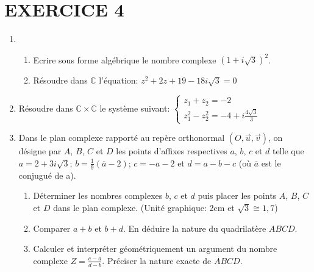\documentclass[13pts]{report}
\begin{document}
	\section*{EXERCICE 4}
		\begin{enumerate}
			\item 
				\begin{enumerate}
					\item Ecrire sous forme algébrique le nombre complexe $(1+i\sqrt{3})^2$.
					\item Résoudre dans $\mathbb{C}$ l'équation: $z^2+2z+19-18i\sqrt{3}=0$
				\end{enumerate}
			\item Résoudre dans $\mathbb{C} \times \mathbb{C}$ le système suivant:
				$\left\{ \begin{array}{l}
					z_1 + z_2 =-2 \\
					z_1^2-z_2^2=-4+i\frac{4\sqrt{3}}{3}
				\end{array} \right.$
				\item Dans le plan complexe rapporté au repère orthonormal $(O,\overrightarrow{u}, \overrightarrow{v})$, on désigne par $A$, $B$, $C$ et $D$ les points d'affixes respectives $a$, $b$, $c$ et $d$ telle que $a=2+3i\sqrt{3}$; $b=\frac{1}{9}(\overline{a} - 2)$; $c=-a-2$  et $d= a-b-c$ (où $\overline{a}$ est le conjugué de a).
			\begin{enumerate}
				\item Déterminer les nombres complexes $b$, $c$ et $d$ puis placer les points $A$, $B$, $C$ et $D$ dans le plan complexe. (Unité graphique: 2cm et $\sqrt{3}\cong 1,7$)
				\item Comparer $a+b$ et $b+d$. En déduire la nature du quadrilatère $ABCD$.
				\item Calculer et interpréter géométriquement un argument du nombre complexe $Z=\frac{c-a}{d-b}$. Préciser la nature exacte de $ABCD$.
			\end{enumerate}
		\end{enumerate}
	
\end{document}

